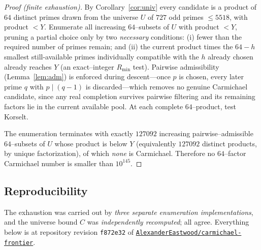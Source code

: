 \documentclass[11pt]{article}
\theoremstyle{definition}
\newcommand{\code}[1]{\texttt{#1}}
\begin{document}
\begin{proof}[Proof (finite exhaustion)]
By Corollary~\ref{cor:univ} every candidate is a product of $64$ distinct primes drawn from the
universe $U$ of $727$ odd primes $\le 5518$, with product $<Y$. Enumerate all increasing
$64$--subsets of $U$ with product $<Y$, pruning a partial choice only by two \emph{necessary}
conditions: (i) fewer than the required number of primes remain; and (ii) the current product times
the $64-h$ smallest still-available primes individually compatible with the $h$ already chosen
already reaches $Y$ (an exact--integer $R_{\min}$ test). Pairwise admissibility
(Lemma~\ref{lem:adm}) is enforced during descent---once $p$ is chosen, every later prime $q$ with
$p\mid(q-1)$ is discarded---which removes no genuine Carmichael candidate, since any real completion
survives pairwise filtering and its remaining factors lie in the current available pool. At each
complete $64$--product, test Korselt.

The enumeration terminates with exactly $127092$ increasing pairwise--admissible $64$--subsets of
$U$ whose product is below $Y$ (equivalently $127092$ distinct products, by unique factorization),
of which \emph{none} is Carmichael. Therefore no $64$--factor Carmichael number is smaller than
$10^{145}$.
\end{proof}

\subsection{Reproducibility}\label{sec:repro}

The exhaustion was carried out by \emph{three separate enumeration implementations}, and the
universe bound $C$ was \emph{independently recomputed}; all agree. Everything below is at repository
revision \code{f872e32} of \href{https://github.com/AlexanderEastwood/carmichael-frontier}{\code{AlexanderEastwood/carmichael-frontier}}.
\end{document}
